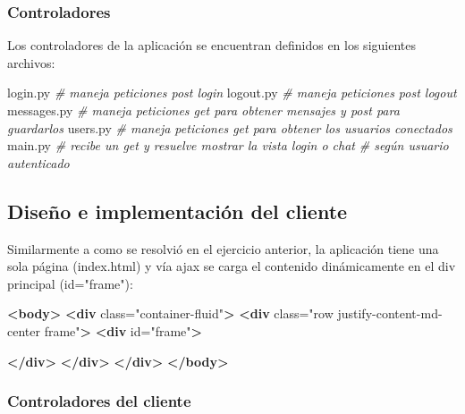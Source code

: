 \documentclass[12pt]{extarticle}
\newenvironment{Shaded}{}{}
\newcommand{\KeywordTok}[1]{\textcolor[rgb]{0.00,0.44,0.13}{\textbf{{#1}}}}
\newcommand{\StringTok}[1]{\textcolor[rgb]{0.25,0.44,0.63}{{#1}}}
\newcommand{\CommentTok}[1]{\textcolor[rgb]{0.38,0.63,0.69}{\textit{{#1}}}}
\newcommand{\OtherTok}[1]{\textcolor[rgb]{0.00,0.44,0.13}{{#1}}}
\newcommand{\NormalTok}[1]{{#1}}
\begin{document}
\subsubsection{Controladores}\label{controladores}

Los controladores de la aplicación se encuentran definidos en los
siguientes archivos:

\begin{Shaded}
\begin{Highlighting}[]
\NormalTok{login.py }
\CommentTok{# maneja peticiones post login}
\NormalTok{logout.py }
\CommentTok{# maneja peticiones post logout}
\NormalTok{messages.py }
\CommentTok{# maneja peticiones get para obtener mensajes y post para guardarlos}
\NormalTok{users.py }
\CommentTok{# maneja peticiones get para obtener los usuarios conectados}
\NormalTok{main.py }
\CommentTok{# recibe un get y resuelve mostrar la vista login o chat }
\CommentTok{# según usuario autenticado }
\end{Highlighting}
\end{Shaded}

\subsection{Diseño e implementación del
cliente}\label{diseuxf1o-e-implementaciuxf3n-del-cliente}

Similarmente a como se resolvió en el ejercicio anterior, la aplicación
tiene una sola página (index.html) y vía ajax se carga el contenido
dinámicamente en el div principal (id="frame"):

\begin{Shaded}
\begin{Highlighting}[]
\KeywordTok{<body>}
  \KeywordTok{<div}\OtherTok{ class=}\StringTok{"container-fluid"}\KeywordTok{>}
    \KeywordTok{<div}\OtherTok{ class=}\StringTok{"row justify-content-md-center frame"}\KeywordTok{>}
      \KeywordTok{<div}\OtherTok{ id=}\StringTok{"frame"}\KeywordTok{>}
        
      \KeywordTok{</div>}
    \KeywordTok{</div>}
  \KeywordTok{</div>}
\KeywordTok{</body>}
\end{Highlighting}
\end{Shaded}

\subsubsection{Controladores del
cliente}\label{controladores-del-cliente}
\end{document}

